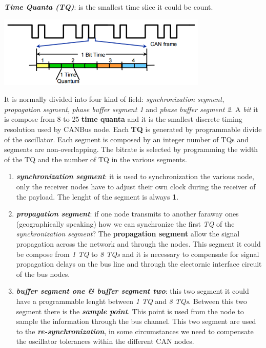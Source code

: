 \newpage
\textbf{\textit{Time Quanta (TQ)}}: is the smallest time slice it could be count. 
\begin{center}
    \centering
    \includegraphics[width=0.75\textwidth]{img/time_quanta}
\end{center}
It is normally divided into four kind of field: \textit{synchronization segment}, \textit{propagation segment}, \textit{phase buffer segment 1} and \textit{phase buffer segment 2}. A \textit{bit} it is compose from 8 to 25 \textbf{time quanta} and it is the smallest discrete timing resolution used by CANBus node. Each \textbf{TQ} is generated by programmable divide of the oscillator. Each segment is composed by an integer number of TQs and segments are non-overlapping. The bitrate is selected by programming the width of the TQ and the number of TQ in the various segments.
\begin{enumerate}[nosep]
    \item \textbf{\textit{synchronization segment}}: it is used to synchronization the various node, only the receiver nodes have to adjust their own clock during the receiver of the payload. The lenght of the segment is always \textbf{1}.
    \item \textbf{\textit{propagation segment}}: if one node transmits to another faraway ones (geographically speaking) how we can synchronize the first \textit{TQ} of the \textit{synchronization segment}? The \textbf{propagation segment} allow the signal propagation across the network and through the nodes. This segment it could be compose from \textit{1 TQ} to \textit{8 TQs} and it is necessary to compensate for signal propagation delays on the bus line and through the electornic interface circuit of the bus nodes.
    \item \textbf{\textit{buffer segment one \& buffer segment two}}: this two segment it could have a programmable lenght between \textit{1 TQ} and \textit{8 TQs}. Between this two segment there is the \textbf{\textit{sample point}}. This point is used from the node to sample the information through the bus channel. This two segment are used to the \textbf{\textit{re-synchronization}}, in some circumstances we need to compensate the oscillator tolerances within the different CAN nodes. 
\end{enumerate}
